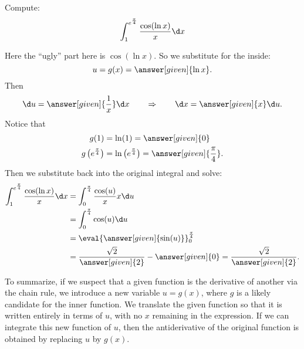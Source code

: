 \documentclass{ximera}
\begin{document}
\begin{example}
  Compute:
  \[
  \int_{1}^{e^{\frac{\pi}{4}}} \frac{\cos(\ln x)}{x} \d x
  \]
\begin{explanation}
Here the ``ugly'' part here is $\cos(\ln x)$.  So we substitute for
the inside:
\[
u=g(x)=\answer[given]{\ln x}.
\]
Then
\[
\d u =  \answer[given]{\frac{1}{x}} \d x 	\qquad	\Rightarrow	\qquad	\d x = \answer[given]{x} \d u.
\]
Notice that
\begin{align*}
g(1) &= \ln (1) = \answer[given]{0} \\
g \left( e^{\frac{\pi}{4}} \right) &= \ln \left( e^{\frac{\pi}{4}} \right) = \answer[given]{\frac{\pi}{4}}.
\end{align*}
Then we substitute back into the original integral and solve:
\begin{align*}
\int_{1}^{e^{\frac{\pi}{4}}} \frac{\cos(\ln x)}{x} \d x &= \int_0^{\frac{\pi}{4}} \frac{\cos(u)}{x} x \d u  \\
&= \int_0^{\frac{\pi}{4}} \cos(u) \d u  \\
&= \eval{\answer[given]{\sin(u)}}_{0}^{\frac{\pi}{4}}  \\
&= \frac{\sqrt{2}}{\answer[given]{2}} - \answer[given]{0} = \frac{\sqrt{2}}{\answer[given]{2}}.
\end{align*}
\end{explanation}
\end{example}

To summarize, if we suspect that a given function is the derivative of
another via the chain rule, we introduce a new variable $u=g(x)$, where $g$ is a likely candidate for
the inner function. We translate the given function so that it is
written entirely in terms of $u$, with no $x$ remaining in the
expression. If we can integrate this new function of $u$, then the
antiderivative of the original function is obtained by replacing $u$
by $g(x)$.
\end{document}
